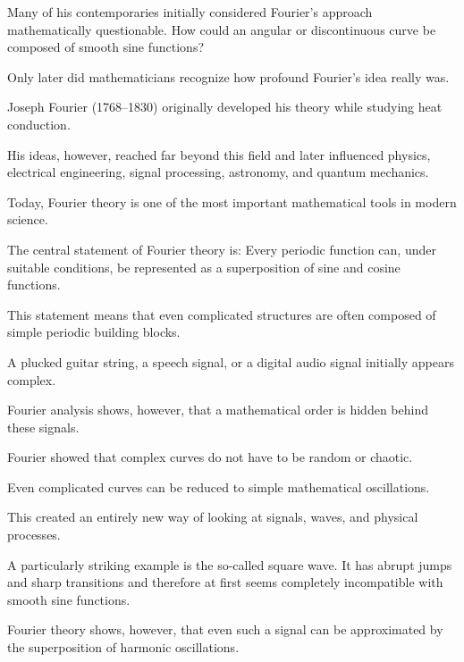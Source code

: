 Many of his contemporaries initially considered Fourier's approach mathematically questionable.
How could an angular or discontinuous curve
be composed of smooth sine functions?

Only later did mathematicians recognize
how profound Fourier's idea really was.

\begin{HistoryBox}
	\small
	\label{box:fourier-joseph-fourier}
	Joseph Fourier (1768--1830) originally developed his theory
	while studying heat conduction.
	
	His ideas, however, reached far beyond this field
	and later influenced physics,
	electrical engineering,
	signal processing,
	astronomy,
	and quantum mechanics.
	
	Today, Fourier theory is one of the most important mathematical tools
	in modern science.
\end{HistoryBox}

The central statement of Fourier theory is:
Every periodic function can, under suitable conditions, be represented as a superposition
of sine and cosine functions.

This statement means
that even complicated structures
are often composed of simple periodic building blocks.

A plucked guitar string,
a speech signal,
or a digital audio signal
initially appears complex.

Fourier analysis shows, however,
that a mathematical order is hidden behind these signals.

\begin{DidacticBox}
	\small
	\label{box:fourier-revolutionaere-idee}
	Fourier showed
	that complex curves do not have to be random or chaotic.
	
	Even complicated curves can be reduced
	to simple mathematical oscillations.
	
	This created an entirely new way of looking
	at signals,
	waves,
	and physical processes.
\end{DidacticBox}
\newpage
\noindent
A particularly striking example is the so-called square wave.
It has abrupt jumps and sharp transitions
and therefore at first seems completely incompatible
with smooth sine functions.

Fourier theory shows, however,
that even such a signal
can be approximated by the superposition of harmonic oscillations.

